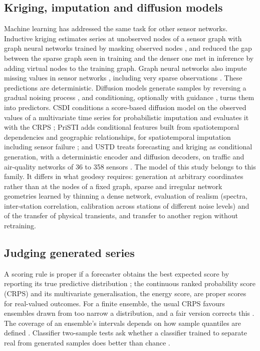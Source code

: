 \documentclass[preprint,12pt,authoryear]{elsarticle}
\begin{document}
\subsection{Kriging, imputation and diffusion models}

Machine learning has addressed the same task for other sensor networks. Inductive kriging
estimates series at unobserved nodes of a sensor graph with graph neural networks trained
by masking observed nodes \citep{wu2021ignnk}, and \citet{xu2025kits} reduced the gap
between the sparse graph seen in training and the denser one met in inference by adding
virtual nodes to the training graph. Graph neural networks also impute missing values in
sensor networks \citep{cini2022grin}, including very sparse observations
\citep{marisca2022spin}. These predictions are deterministic. Diffusion models generate
samples by reversing a gradual noising process \citep{ho2020ddpm,karras2022edm}, and
conditioning, optionally with guidance \citep{ho2022cfg}, turns them into predictors.
CSDI conditions a score-based diffusion model on the observed values of a multivariate
time series for probabilistic imputation and evaluates it with the CRPS
\citep{tashiro2021csdi}; PriSTI adds conditional features built from spatiotemporal
dependencies and geographic relationships, for spatiotemporal imputation including sensor
failure \citep{liu2023pristi}; and USTD treats forecasting and kriging as conditional
generation, with a deterministic encoder and diffusion decoders, on traffic and
air-quality networks of 36 to 358 sensors \citep{hu2024ustd}. The model of this study
belongs to this family. It differs in what geodesy requires: generation at arbitrary
coordinates rather than at the nodes of a fixed graph, sparse and irregular network
geometries learned by thinning a dense network, evaluation of realism (spectra,
inter-station correlation, calibration across stations of different noise levels) and of
the transfer of physical transients, and transfer to another region without retraining.

\subsection{Judging generated series}

A scoring rule is proper if a forecaster obtains the best expected score by reporting its
true predictive distribution \citep{gneiting2007}; the continuous ranked probability
score (CRPS) and its multivariate generalisation, the energy score, are proper scores for
real-valued outcomes. For a finite ensemble, the usual CRPS favours ensembles drawn from
too narrow a distribution, and a fair version corrects this \citep{ferro2014}. The
coverage of an ensemble's intervals depends on how sample quantiles are defined
\citep{hyndman1996}. Classifier two-sample tests ask whether a classifier trained to
separate real from generated samples does better than chance \citep{lopezpaz2017}.
\end{document}
